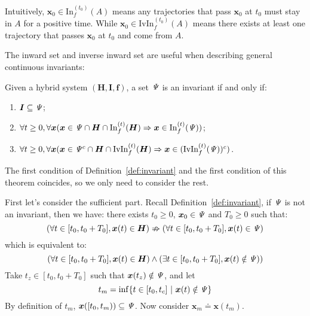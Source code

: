 \documentclass{jssc}
\begin{document}
Intuitively, $\boldsymbol{x}_0 \in \mathrm{In}_f^{(t_0)}(A)$ means any trajectories that pass $\boldsymbol{x}_0$ at $t_0$ must stay in $A$ for a positive time. While $\boldsymbol{x}_0 \in \mathrm{IvIn}_f^{(t_0)}(A)$ means there exists at least one trajectory that passes $\boldsymbol{x}_0$ at $t_0$ and come from $A$.

The inward set and inverse inward set are useful when describing general continuous invariants:

\begin{theorem}
\label{thm:inIvin}
Given a hybrid system $(\boldsymbol{H}, \boldsymbol{I}, \boldsymbol{f})$, a set ${\it \Psi}$ is an invariant if and only if:
\begin{enumerate}
    \item $\boldsymbol{I} \subseteq {\it \Psi}$;
	\item $\forall t \geq 0, \forall \boldsymbol{x} (\boldsymbol{x} \in {\it \Psi} \cap \boldsymbol{H} \cap \mathrm{In}_f^{(t)}(\boldsymbol{H}) \Rightarrow \boldsymbol{x} \in \mathrm{In}_f^{(t)}({\it \Psi}))$;
	\item $\forall t \geq 0, \forall \boldsymbol{x} (\boldsymbol{x} \in {\it \Psi}^c \cap \boldsymbol{H} \cap \mathrm{IvIn}_f^{(t)}(\boldsymbol{H}) \Rightarrow \boldsymbol{x} \in (\mathrm{IvIn}_f^{(t)}({\it \Psi}))^c)$.
\end{enumerate}
\end{theorem}

\proof
The first condition of Definition~\ref{def:invariant} and the first condition of this theorem coincides, so we only need to consider the rest.

First let's consider the sufficient part. Recall Definition~\ref{def:invariant}, if ${\it \Psi}$ is not an invariant, then we have: there exists $t_0 \geq 0$, $\boldsymbol{x}_0 \in {\it \Psi}$ and $T_0 \geq 0$ such that:
\begin{equation*}
	(\forall t \in [t_0, t_0 + T_0], \boldsymbol{x}(t) \in \boldsymbol{H}) \nRightarrow (\forall t \in [t_0, t_0 + T_0], \boldsymbol{x}(t) \in {\it \Psi})
\end{equation*}
which is equivalent to:
\begin{equation*}
	(\forall t \in [t_0, t_0 + T_0], \boldsymbol{x}(t) \in \boldsymbol{H}) \wedge (\exists t \in [t_0, t_0 + T_0], \boldsymbol{x}(t) \notin {\it \Psi}))
\end{equation*}
Take $t_z \in [t_0, t_0 + T_0]$ such that $\boldsymbol{x}(t_z) \notin {\it \Psi}$, and let
\begin{equation*}
	t_m = \inf \{ t \in [t_0, t_c]\ |\ \boldsymbol{x}(t) \notin {\it \Psi} \}
\end{equation*}
By definition of $t_m$, $\boldsymbol{x}([t_0, t_m)) \subseteq {\it \Psi}$. Now consider $\boldsymbol{x}_m \doteq \boldsymbol{x}(t_m)$.
\end{document}
